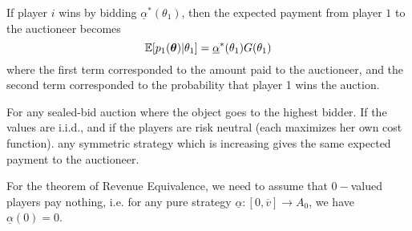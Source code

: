 \begin{remark}
	If player $i$ wins by bidding $\underline{\alpha}^*(\theta_1)$, then the expected payment from player $1$ to the auctioneer becomes
	$$
		\mathbb{E}[p_1(\boldsymbol{\theta})| \theta_1] = \underline{\alpha}^*(\theta_1) G(\theta_1)
	$$
	where the first term corresponded to the amount paid to the auctioneer, and the second term corresponded to the probability that player 1 wins the auction.
\end{remark}

 
\begin{theorem}
	For any sealed-bid auction where the object goes to the highest bidder. If the values are i.i.d., and if the players are risk neutral (each maximizes her own cost function). any symmetric strategy which is increasing gives the same expected payment to the auctioneer.
\end{theorem}


{\color{red}
\begin{remark}
	For the theorem of Revenue Equivalence, we need to assume that $0-$valued players pay nothing, i.e. for any pure strategy $\underline{\alpha} : [0,\overline{v}] \to A_0$, we have $\underline{\alpha}(0) = 0$.	
\end{remark}
}


